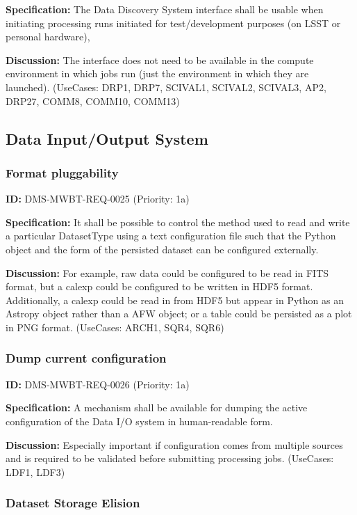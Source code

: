 \documentclass[SE,toc,lsstdraft]{lsstdoc}
\begin{document}
\textbf{Specification:}
The Data Discovery System interface shall be usable when initiating processing runs initiated for test/development purposes (on LSST or personal hardware),

\textbf{Discussion:}
The interface does not need to be available in the compute environment in which jobs run (just the environment in which they are launched). (UseCases: DRP1, DRP7, SCIVAL1, SCIVAL2, SCIVAL3, AP2, DRP27, COMM8, COMM10, COMM13)

\subsection{Data Input/Output System}

\subsubsection{Format pluggability}

\label{DMS-MWBT-REQ-0025}
\textbf{ID:} DMS-MWBT-REQ-0025 (Priority: 1a)

\textbf{Specification:}
It shall be possible to control the method used to read and write a particular DatasetType using a text configuration file such that the Python object and the form of the persisted dataset can be configured externally.

\textbf{Discussion:}
For example, raw data could be configured to be read in FITS format, but a calexp could be configured to be written in HDF5 format. Additionally, a calexp could be read in from HDF5 but appear in Python as an Astropy object rather than a AFW object; or a table could be persisted as a plot in PNG format. (UseCases: ARCH1, SQR4, SQR6)

\subsubsection{Dump current configuration}

\label{DMS-MWBT-REQ-0026}
\textbf{ID:} DMS-MWBT-REQ-0026 (Priority: 1a)

\textbf{Specification:}
A mechanism shall be available for dumping the active configuration of the Data I/O system in human-readable form.

\textbf{Discussion:}
Especially important if configuration comes from multiple sources and is required to be validated before submitting processing jobs. (UseCases: LDF1, LDF3)

\subsubsection{Dataset Storage Elision}
\end{document}
